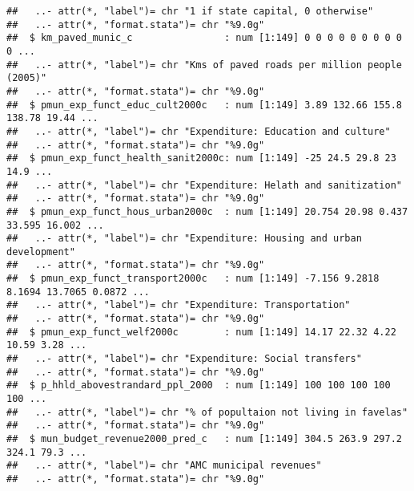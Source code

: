 \documentclass[
]{article}
\begin{document}
\begin{verbatim}
##   ..- attr(*, "label")= chr "1 if state capital, 0 otherwise"
##   ..- attr(*, "format.stata")= chr "%9.0g"
##  $ km_paved_munic_c                : num [1:149] 0 0 0 0 0 0 0 0 0 0 ...
##   ..- attr(*, "label")= chr "Kms of paved roads per million people (2005)"
##   ..- attr(*, "format.stata")= chr "%9.0g"
##  $ pmun_exp_funct_educ_cult2000c   : num [1:149] 3.89 132.66 155.8 138.78 19.44 ...
##   ..- attr(*, "label")= chr "Expenditure: Education and culture"
##   ..- attr(*, "format.stata")= chr "%9.0g"
##  $ pmun_exp_funct_health_sanit2000c: num [1:149] -25 24.5 29.8 23 14.9 ...
##   ..- attr(*, "label")= chr "Expenditure: Helath and sanitization"
##   ..- attr(*, "format.stata")= chr "%9.0g"
##  $ pmun_exp_funct_hous_urban2000c  : num [1:149] 20.754 20.98 0.437 33.595 16.002 ...
##   ..- attr(*, "label")= chr "Expenditure: Housing and urban development"
##   ..- attr(*, "format.stata")= chr "%9.0g"
##  $ pmun_exp_funct_transport2000c   : num [1:149] -7.156 9.2818 8.1694 13.7065 0.0872 ...
##   ..- attr(*, "label")= chr "Expenditure: Transportation"
##   ..- attr(*, "format.stata")= chr "%9.0g"
##  $ pmun_exp_funct_welf2000c        : num [1:149] 14.17 22.32 4.22 10.59 3.28 ...
##   ..- attr(*, "label")= chr "Expenditure: Social transfers"
##   ..- attr(*, "format.stata")= chr "%9.0g"
##  $ p_hhld_abovestrandard_ppl_2000  : num [1:149] 100 100 100 100 100 ...
##   ..- attr(*, "label")= chr "% of popultaion not living in favelas"
##   ..- attr(*, "format.stata")= chr "%9.0g"
##  $ mun_budget_revenue2000_pred_c   : num [1:149] 304.5 263.9 297.2 324.1 79.3 ...
##   ..- attr(*, "label")= chr "AMC municipal revenues"
##   ..- attr(*, "format.stata")= chr "%9.0g"
\end{verbatim}
\end{document}
